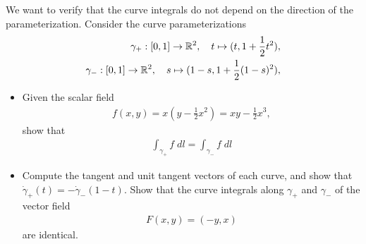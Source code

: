 \documentclass[11pt]{article}
\begin{document}
\begin{exercise}
    We want to verify that the curve integrals do not depend on the direction of the parameterization.
    Consider the curve parameterizations
    \begin{align}
        \gamma_+ : [0,1] \rightarrow \mathbb{R}^2, \quad t \mapsto ( t, 1 + \frac 1 2 t^2 ),
        \\
        \gamma_- : [0,1] \rightarrow \mathbb{R}^2, \quad s \mapsto ( 1-s, 1 + \frac 1 2 (1-s)^2 ),
    \end{align}
    \begin{itemize}
     \item Given the scalar field 
     \begin{align*}
        f(x,y) 
        = x ( y - \frac 1 2 x^2 )
        = x y - \frac 1 2 x^3
        ,
     \end{align*}
     show that 
     \begin{align}
        \int_{\gamma_+} f \;dl = \int_{\gamma_-} f \;dl
     \end{align}
     \item Compute the tangent and unit tangent vectors of each curve,
     and show that $\dot\gamma_+(t) = - \dot\gamma_-(1-t)$.
     Show that the curve integrals along $\gamma_+$ and $\gamma_-$ of the vector field
     \begin{align}
        F(x,y) = (-y,x)
     \end{align}
     are identical.
    \end{itemize}
\end{exercise}
\end{document}
